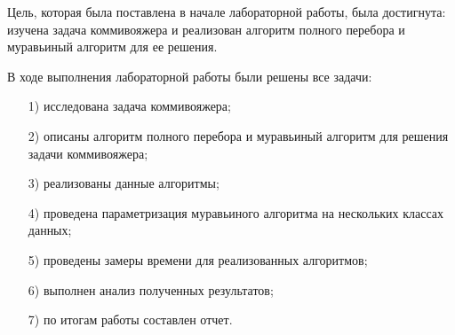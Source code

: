 
Цель, которая была поставлена в начале лабораторной работы, была достигнута: изучена задача коммивояжера и реализован алгоритм
полного перебора и муравьиный алгоритм для ее решения.

В ходе выполнения лабораторной работы были решены все задачи:
\begin{enumerate}[itemindent=1em]
	\item[1)] исследована задача коммивояжера;
	\item[2)] описаны алгоритм полного перебора и муравьиный алгоритм для решения задачи коммивояжера;
	\item[3)] реализованы данные алгоритмы;
	\item[4)] проведена параметризация муравьиного алгоритма на нескольких классах данных;
	\item[5)] проведены замеры времени для реализованных алгоритмов;
	\item[6)] выполнен анализ полученных результатов;
	\item[7)] по итогам работы составлен отчет.
\end{enumerate}
